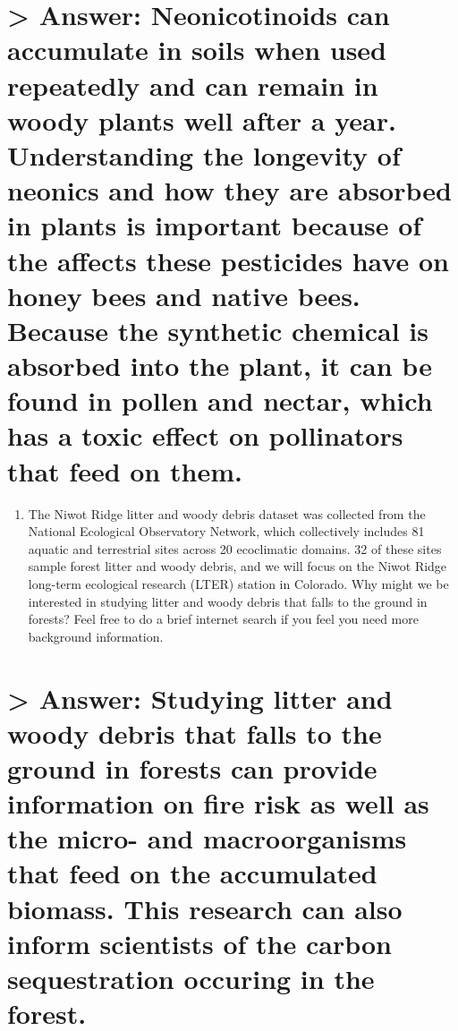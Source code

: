 \documentclass[]{article}
\providecommand{\tightlist}{%
  \setlength{\itemsep}{0pt}\setlength{\parskip}{0pt}}
\begin{document}
\section{\textgreater{} Answer: Neonicotinoids can accumulate in soils
when used repeatedly and can remain in woody plants well after a year.
Understanding the longevity of neonics and how they are absorbed in
plants is important because of the affects these pesticides have on
honey bees and native bees. Because the synthetic chemical is absorbed
into the plant, it can be found in pollen and nectar, which has a toxic
effect on pollinators that feed on
them.}\label{answer-neonicotinoids-can-accumulate-in-soils-when-used-repeatedly-and-can-remain-in-woody-plants-well-after-a-year.-understanding-the-longevity-of-neonics-and-how-they-are-absorbed-in-plants-is-important-because-of-the-affects-these-pesticides-have-on-honey-bees-and-native-bees.-because-the-synthetic-chemical-is-absorbed-into-the-plant-it-can-be-found-in-pollen-and-nectar-which-has-a-toxic-effect-on-pollinators-that-feed-on-them.}

\begin{enumerate}
\def\labelenumi{\arabic{enumi}.}
\setcounter{enumi}{2}
\tightlist
\item
  The Niwot Ridge litter and woody debris dataset was collected from the
  National Ecological Observatory Network, which collectively includes
  81 aquatic and terrestrial sites across 20 ecoclimatic domains. 32 of
  these sites sample forest litter and woody debris, and we will focus
  on the Niwot Ridge long-term ecological research (LTER) station in
  Colorado. Why might we be interested in studying litter and woody
  debris that falls to the ground in forests? Feel free to do a brief
  internet search if you feel you need more background information.
\end{enumerate}

\section{\textgreater{} Answer: Studying litter and woody debris that
falls to the ground in forests can provide information on fire risk as
well as the micro- and macroorganisms that feed on the accumulated
biomass. This research can also inform scientists of the carbon
sequestration occuring in the
forest.}\label{answer-studying-litter-and-woody-debris-that-falls-to-the-ground-in-forests-can-provide-information-on-fire-risk-as-well-as-the-micro--and-macroorganisms-that-feed-on-the-accumulated-biomass.-this-research-can-also-inform-scientists-of-the-carbon-sequestration-occuring-in-the-forest.}
\end{document}
